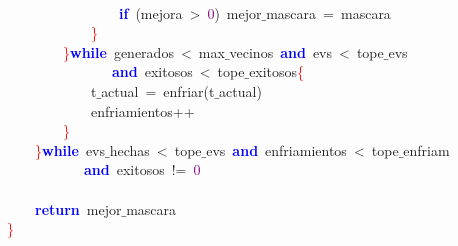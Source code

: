 \mbox{} \\
\mbox{}\ \ \ \ \ \ \ \ \ \ \ \ \ \ \ \ \textbf{\textcolor{Blue}{if}}\ \textcolor{BrickRed}{(}mejora\ \textcolor{BrickRed}{\textgreater{}}\ \textcolor{Purple}{0}\textcolor{BrickRed}{)}\ mejor$\_$mascara\ \textcolor{BrickRed}{=}\ mascara \\
\mbox{}\ \ \ \ \ \ \ \ \ \ \ \ \textcolor{Red}{\}} \\
\mbox{}\ \ \ \ \ \ \ \ \textcolor{Red}{\}}\textbf{\textcolor{Blue}{while}}\ generados\ \textcolor{BrickRed}{\textless{}}\ max$\_$vecinos\ \textbf{\textcolor{Blue}{and}}\ evs\ \textcolor{BrickRed}{\textless{}}\ tope$\_$evs \\
\mbox{}\ \ \ \ \ \ \ \ \ \ \ \ \ \ \ \textbf{\textcolor{Blue}{and}}\ exitosos\ \textcolor{BrickRed}{\textless{}}\ tope$\_$exitosos\textcolor{Red}{\{} \\
\mbox{}\ \ \ \ \ \ \ \ \ \ \ \ t$\_$actual\ \textcolor{BrickRed}{=}\ enfriar\textcolor{BrickRed}{(}t$\_$actual\textcolor{BrickRed}{)} \\
\mbox{}\ \ \ \ \ \ \ \ \ \ \ \ enfriamientos\textcolor{BrickRed}{++} \\
\mbox{}\ \ \ \ \ \ \ \ \textcolor{Red}{\}} \\
\mbox{}\ \ \ \ \textcolor{Red}{\}}\textbf{\textcolor{Blue}{while}}\ evs$\_$hechas\ \textcolor{BrickRed}{\textless{}}\ tope$\_$evs\ \textbf{\textcolor{Blue}{and}}\ enfriamientos\ \textcolor{BrickRed}{\textless{}}\ tope$\_$enfriam \\
\mbox{}\ \ \ \ \ \ \ \ \ \ \ \textbf{\textcolor{Blue}{and}}\ exitosos\ \textcolor{BrickRed}{!=}\ \textcolor{Purple}{0} \\
\mbox{} \\
\mbox{}\ \ \ \ \textbf{\textcolor{Blue}{return}}\ mejor$\_$mascara \\
\mbox{}\textcolor{Red}{\}} \\
\mbox{}
